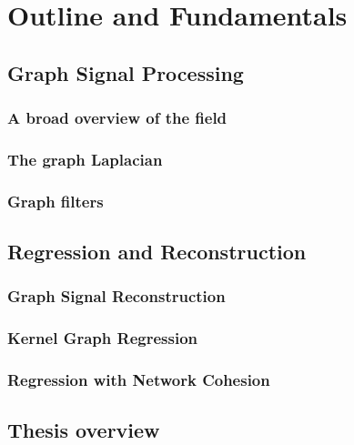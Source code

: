 \chapter{Outline and Fundamentals} %

\label{chap:outline} %



\section{Graph Signal Processing}


\subsection{A broad overview of the field}


\subsection{The graph Laplacian}


\subsection{Graph filters}


\section{Regression and Reconstruction}


\subsection{Graph Signal Reconstruction}


\subsection{Kernel Graph Regression}


\subsection{Regression with Network Cohesion}


\section{Thesis overview}

